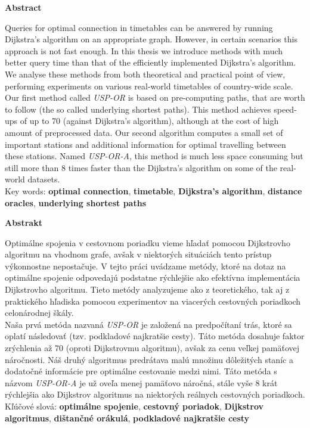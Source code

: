 \documentclass[a4paper]{article}
\renewenvironment{abstract}[1]
{
	\Large
	\begin{center}
		\textbf{#1}
	\end{center}
	
	\normalsize
	
	\addtolength{\leftskip}{1in}
	\addtolength{\rightskip}{1in}
	\setlength{\parindent}{0in}
}
{
}
\numberwithin{algorithm}{section}
\numberwithin{figure}{section}
\numberwithin{table}{section}
\numberwithin{equation}{section}
\begin{document}
    \begin{abstract}{Abstract}
		Queries for optimal connection in timetables can be answered by running Dijkstra's algorithm on an appropriate graph. However, in certain scenarios this approach is not fast enough. In this thesis we introduce methods with much better query time than that of the efficiently implemented Dijkstra's algorithm. We analyse these methods from both theoretical and practical point of view, performing experiments on various real-world timetables of country-wide scale. \\

		Our first method called {\it USP-OR} is based on pre-computing paths, that are worth to follow (the so called underlying shortest paths). This method achieves speed-ups of up to 70 (against Dijkstra's algorithm), although at the cost of high amount of preprocessed data. Our second algorithm computes a small set of important stations and additional information for optimal travelling between these stations. Named {\it USP-OR-A}, this method is much less space consuming but still more than 8 times faster than the Dijkstra's algorithm on some of the real-world datasets. \\

		Key words: \textbf{optimal connection}, \textbf{timetable}, \textbf{Dijkstra's algorithm}, \textbf{distance oracles}, \textbf{underlying shortest paths}
	\end{abstract}	

    \begin{abstract}{Abstrakt}
		Optimálne spojenia v cestovnom poriadku vieme hľadať pomocou Dijkstrovho algoritmu na vhodnom grafe, avšak v niektorých situáciách tento prístup výkonnostne nepostačuje. V tejto práci uvádzame metódy, ktoré na dotaz na optimálne spojenie odpovedajú podstatne rýchlejšie ako efektívna implementácia Dijkstrovho algoritmu. Tieto metódy analyzujeme ako z teoretického, tak aj z praktického hľadiska pomocou experimentov na viacerých cestovných poriadkoch celonárodnej škály. \\
		
		Naša prvá metóda nazvaná {\it USP-OR} je založená na predpočítaní trás, ktoré sa oplatí následovať (tzv. podkladové najkratšie cesty). Táto metóda dosahuje faktor zrýchlenia až 70 (oproti Dijkstrovmu algoritmu), avšak za cenu veľkej pamäťovej náročnosti. Náš druhý algoritmus predrátava malú množinu dôležitých staníc a dodatočné informácie pre optimálne cestovanie medzi nimi. Táto metóda s názvom {\it USP-OR-A} je už oveľa menej pamäťovo náročná, stále vyše 8 krát rýchlejšia ako Dijkstrov algoritmus na niektorých reálnych cestovných poriadkoch. \\

		Kľúčové slová: \textbf{optimálne spojenie}, \textbf{cestovný poriadok}, \textbf{Dijkstrov algoritmus}, \textbf{dištančné orákulá}, \textbf{podkladové najkratšie cesty}
	\end{abstract}	
	
\end{document}
